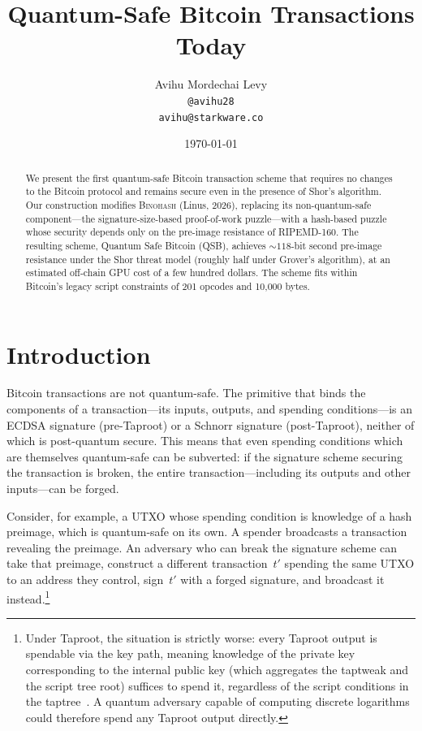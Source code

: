 \documentclass[11pt, a4paper]{article}
\title{\textbf{Quantum-Safe Bitcoin Transactions Today}}
\author{Avihu Mordechai Levy\\\texttt{@avihu28}\\\texttt{avihu@starkware.co}}
\date{\today}
\begin{document}
\maketitle

\begin{abstract}
We present the first quantum-safe Bitcoin transaction scheme that requires no changes to the Bitcoin protocol and remains secure even in the presence of Shor's algorithm. Our construction modifies \textsc{Binohash} (Linus, 2026), replacing its non-quantum-safe component---the signature-size-based proof-of-work puzzle---with a hash-based puzzle whose security depends only on the pre-image resistance of RIPEMD-160. The resulting scheme, Quantum Safe Bitcoin (QSB), achieves ${\sim}118$-bit second pre-image resistance under the Shor threat model (roughly half under Grover's algorithm), at an estimated off-chain GPU cost of a few hundred dollars. The scheme fits within Bitcoin's legacy script constraints of 201 opcodes and 10{,}000 bytes.
\end{abstract}

\section{Introduction}
\label{sec:introduction}

Bitcoin transactions are not quantum-safe. The primitive that binds the components of a transaction---its inputs, outputs, and spending conditions---is an ECDSA signature (pre-Taproot) or a Schnorr signature (post-Taproot), neither of which is post-quantum secure. This means that even spending conditions which are themselves quantum-safe can be subverted: if the signature scheme securing the transaction is broken, the entire transaction---including its outputs and other inputs---can be forged.

Consider, for example, a UTXO whose spending condition is knowledge of a hash preimage, which is quantum-safe on its own. A spender broadcasts a transaction revealing the preimage. An adversary who can break the signature scheme can take that preimage, construct a different transaction~$t'$ spending the same UTXO to an address they control, sign~$t'$ with a forged signature, and broadcast it instead.\footnote{Under Taproot, the situation is strictly worse: every Taproot output is spendable via the key path, meaning knowledge of the private key corresponding to the internal public key (which aggregates the taptweak and the script tree root) suffices to spend it, regardless of the script conditions in the taptree~\cite{bip341}. A quantum adversary capable of computing discrete logarithms could therefore spend any Taproot output directly.}
\end{document}

